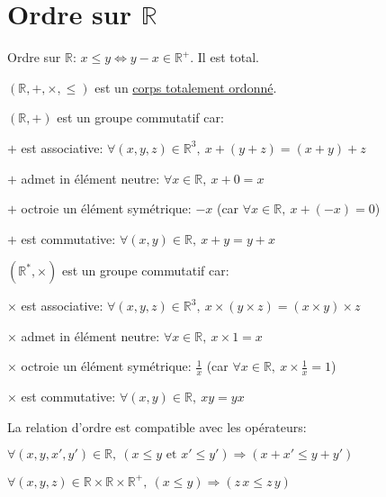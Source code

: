 \documentclass[12pt,twoside,a4paper]{article}
\begin{document}
	\section{Ordre sur $\mathbb{R}$}
		Ordre sur $\mathbb{R}$: $x\leqslant y\iff y-x\in\mathbb{R}^+$. Il est total.
		\begin{prop}
			$(\mathbb{R},+,\times,\leqslant)$ est un \underline{corps totalement ordonn\'e}.\\
			\begin{liste}
				\item $(\mathbb{R},+)$ est un groupe commutatif car:
					\begin{liste}
						\item[]$+$ est associative: $\forall(x,y,z)\in \mathbb{R}^3,\ x+(y+z)=(x+y)+z$
						\item[]$+$ admet in \'el\'ement neutre: $\forall x\in\mathbb{R},\ x+0=x$
						\item[]$+$ octroie un \'el\'ement sym\'etrique: $-x$ (car $\forall x\in\mathbb{R},\ x+(-x)=0$)
						\item[]$+$ est commutative: $\forall(x,y)\in\mathbb{R},\ x+y=y+x$
					\end{liste}
				\item $(\mathbb{R}^*,\times)$ est un groupe commutatif car:
					\begin{liste}
						\item[]$\times$ est associative: $\forall(x,y,z)\in \mathbb{R}^3,\ x\times(y\times z)=(x\times y)\times z$
						\item[]$\times$ admet in \'el\'ement neutre: $\forall x\in\mathbb{R},\ x\times1=x$
						\item[]$\times$ octroie un \'el\'ement sym\'etrique: $\frac{1}{x}$ (car $\forall x\in\mathbb{R},\ x\times\frac{1}{x}=1$)
						\item[]$\times$ est commutative: $\forall(x,y)\in\mathbb{R},\ xy=yx$
					\end{liste}
				\item La relation d'ordre est compatible avec les op\'erateurs:
					\begin{liste}
						\item[]$\forall(x,y,x',y')\in\mathbb{R},\ (x\leqslant y\text{ et }x'\leqslant y')\Rightarrow(x+x'\leqslant y+y')$
						\item[]$\forall(x,y,z)\in\mathbb{R}\times\mathbb{R}\times\mathbb{R}^+,\ (x\leqslant y)\Rightarrow (z\,x\leqslant z\,y)$
					\end{liste}
			\end{liste}
		\end{prop}
\end{document}
